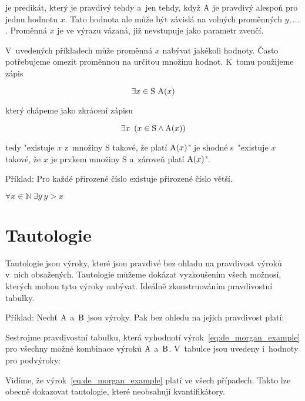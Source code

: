 je predikát, který je pravdivý tehdy a~jen tehdy, když \(\mathrm{A}\) je pravdivý alespoň pro jednu hodnotu \(x\). Tato hodnota ale může být závislá na volných proměnných \(y, ...\). Proměnná \(x\) je ve výrazu vázaná, již nevstupuje jako parametr zvenčí.

V~uvedených příkladech může proměnná \(x\) nabývat jakékoli hodnoty. Často potřebujeme omezit proměnnou na určitou množinu hodnot. K~tomu použijeme zápis

\begin{equation}
\exists x \in \mathrm{S} \ \predicate{A}(x)
\end{equation}

který chápeme jako zkrácení zápisu

\begin{equation}
\exists x \ \left( x \in \mathrm{S} \land \mathrm{A}(x) \right)
\end{equation}

tedy "existuje \(x\) z~množiny \(\mathrm{S}\) takové, že platí \(\mathrm{A}(x)\)" je shodné s~"existuje \(x\) takové, že \(x\) je prvkem množiny \(\mathrm{S}\) a~zároveň platí \(\mathrm{A}(x)\)".

Příklad: Pro každé přirozené číslo existuje přirozené číslo větší. 

\(\forall x \in \mathbb{N} \ \exists y \ y > x\)

\section{Tautologie}

Tautologie jsou výroky, které jsou pravdivé bez ohladu na pravdivost výroků v~nich obsažených. Tautologie můžeme dokázat vyzkoušením všech možnosí, kterých mohou tyto výroky nabývat. Ideálně zkonstruováním pravdivostní tabulky.

Příklad: Nechť \(\mathrm{A}\) a~\(\mathrm{B}\) jsou výroky. Pak bez ohledu na jejich pravdivost platí:


Sestrojme pravdivostní tabulku, která vyhodnotí výrok~\eqref{eq:de_morgan_example} pro všechny možné kombinace výroků \(\mathrm{A}\) a~\(\mathrm{B}\). V~tabulce jsou uvedeny i~hodnoty pro podvýroky:


Vidíme, že výrok~\eqref{eq:de_morgan_example} platí ve všech případech. Takto lze obecně dokazovat tautologie, které neobsahují kvantifikátory.

